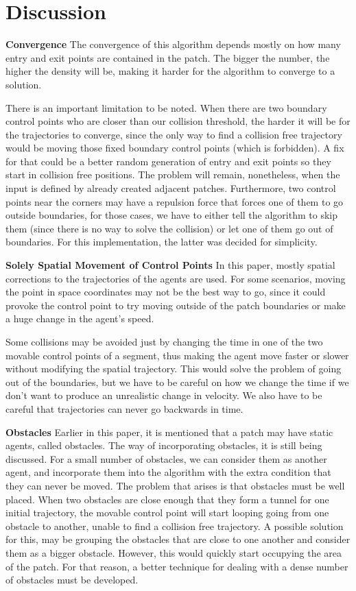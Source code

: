 \section{Discussion}
\label{sec:discussion}

\textbf{Convergence}
The convergence of this algorithm depends mostly on how many entry and exit points are contained in the patch. The bigger the number, the higher the density will be, making it harder for the algorithm to converge to a solution.

There is an important limitation to be noted. When there are two boundary control points who are closer than our collision threshold, the harder it will be for the trajectories to converge, since the only way to find a collision free trajectory would be moving those fixed boundary control points (which is forbidden). A fix for that could be a better random generation of entry and exit points so they start in collision free positions. The problem will remain, nonetheless, when the input is defined by already created adjacent patches. Furthermore, two control points near the corners may have a repulsion force that forces one of them to go outside boundaries, for those cases, we have to either tell the algorithm to skip them (since there is no way to solve the collision) or let one of them go out of boundaries. For this implementation, the latter was decided for simplicity. 




\textbf{Solely Spatial Movement of Control Points}
In this paper, mostly spatial corrections to the trajectories of the agents are used. For some scenarios, moving the point in space coordinates may not be the best way to go, since it could provoke the control point to try moving outside of the patch boundaries or make a huge change in the agent's speed.   

Some collisions may be avoided just by changing the time in one of the two movable control points of a segment, thus making the agent move faster or slower without modifying the spatial trajectory. This would solve the problem of going out of the boundaries, but we have to be careful on how we change the time if we don't want to produce an unrealistic change in velocity.  We also have to be careful that trajectories can never go backwards in time. 


\textbf{Obstacles}
Earlier in this paper, it is mentioned that a patch may have static agents, called obstacles. The way of incorporating obstacles, it is still being discussed. For a small number of obstacles, we can consider them as another agent, and incorporate them into the algorithm with the extra condition that they can never be moved. The problem that arises is that obstacles must be well placed. When two obstacles are close enough that they form a tunnel for one initial trajectory, the movable control point will start looping going from one obstacle to another, unable to find a collision free trajectory. A possible solution for this, may be grouping the obstacles that are close to one another and consider them as a bigger obstacle. However, this would quickly start occupying the area of the patch. For that reason, a better technique for dealing with a dense number of obstacles must be developed. 

